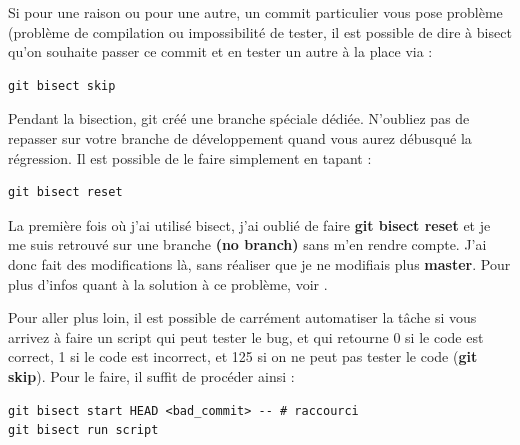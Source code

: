 \documentclass[a4paper,twoside]{article}
\begin{document}
\begin{attention}
Si pour une raison ou pour une autre, un commit particulier vous pose problème (problème de compilation ou impossibilité de tester, il est possible de dire à bisect qu'on souhaite passer ce commit et en tester un autre à la place via :
\begin{verbatim}
git bisect skip
\end{verbatim}
\end{attention}


\begin{important}
Pendant la bisection, git créé une branche spéciale dédiée. N’oubliez pas de repasser sur votre branche de développement quand vous aurez débusqué la régression. Il est possible de le faire simplement en tapant :
\begin{verbatim}
git bisect reset
\end{verbatim}
\end{important}

\begin{remarque}
La première fois où j'ai utilisé bisect, j'ai oublié de faire \textbf{git bisect reset} et je me suis retrouvé sur une branche \textbf{(no branch)} sans m'en rendre compte. J'ai donc fait des modifications là, sans réaliser que je ne modifiais plus \textbf{master}. Pour plus d'infos quant à la solution à ce problème, voir .
\end{remarque}

\bigskip

Pour aller plus loin, il est possible de carrément automatiser la tâche si vous arrivez à faire un script qui peut tester le bug, et qui retourne 0 si le code est correct, 1 si le code est incorrect, et 125 si on ne peut pas tester le code (\textbf{git skip}). Pour le faire, il suffit de procéder ainsi :
\begin{verbatim}
git bisect start HEAD <bad_commit> -- # raccourci
git bisect run script
\end{verbatim}
\end{document}
